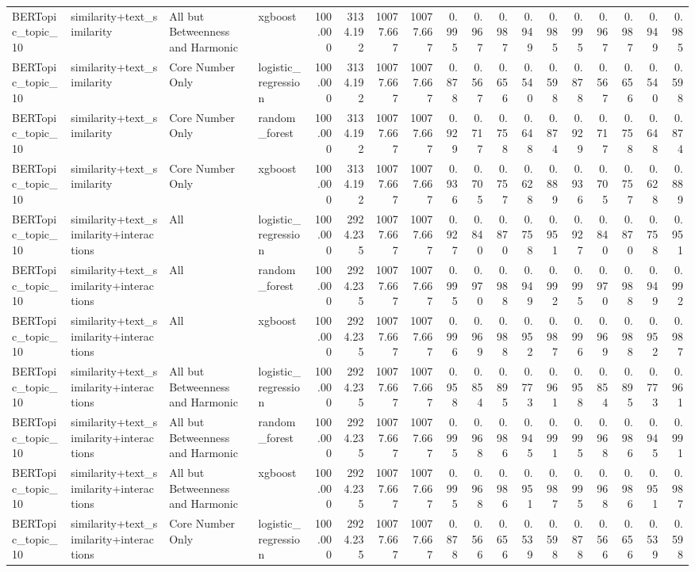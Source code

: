 \begin{tabular}{llllrrrrrrrrrrrrrr}
BERTopic_topic_10 & similarity+text_similarity & All but Betweenness and Harmonic & xgboost & 100.000 & 3134.192 & 10077.667 & 10077.667 & 0.995 & 0.967 & 0.987 & 0.949 & 0.985 & 0.995 & 0.967 & 0.987 & 0.949 & 0.985 \\
BERTopic_topic_10 & similarity+text_similarity & Core Number Only & logistic_regression & 100.000 & 3134.192 & 10077.667 & 10077.667 & 0.878 & 0.567 & 0.656 & 0.540 & 0.598 & 0.878 & 0.567 & 0.656 & 0.540 & 0.598 \\
BERTopic_topic_10 & similarity+text_similarity & Core Number Only & random_forest & 100.000 & 3134.192 & 10077.667 & 10077.667 & 0.929 & 0.717 & 0.758 & 0.648 & 0.874 & 0.929 & 0.717 & 0.758 & 0.648 & 0.874 \\
BERTopic_topic_10 & similarity+text_similarity & Core Number Only & xgboost & 100.000 & 3134.192 & 10077.667 & 10077.667 & 0.936 & 0.705 & 0.757 & 0.628 & 0.889 & 0.936 & 0.705 & 0.757 & 0.628 & 0.889 \\
BERTopic_topic_10 & similarity+text_similarity+interactions & All & logistic_regression & 100.000 & 2924.235 & 10077.667 & 10077.667 & 0.927 & 0.840 & 0.870 & 0.758 & 0.951 & 0.927 & 0.840 & 0.870 & 0.758 & 0.951 \\
BERTopic_topic_10 & similarity+text_similarity+interactions & All & random_forest & 100.000 & 2924.235 & 10077.667 & 10077.667 & 0.995 & 0.970 & 0.988 & 0.949 & 0.992 & 0.995 & 0.970 & 0.988 & 0.949 & 0.992 \\
BERTopic_topic_10 & similarity+text_similarity+interactions & All & xgboost & 100.000 & 2924.235 & 10077.667 & 10077.667 & 0.996 & 0.969 & 0.988 & 0.952 & 0.987 & 0.996 & 0.969 & 0.988 & 0.952 & 0.987 \\
BERTopic_topic_10 & similarity+text_similarity+interactions & All but Betweenness and Harmonic & logistic_regression & 100.000 & 2924.235 & 10077.667 & 10077.667 & 0.958 & 0.854 & 0.895 & 0.773 & 0.961 & 0.958 & 0.854 & 0.895 & 0.773 & 0.961 \\
BERTopic_topic_10 & similarity+text_similarity+interactions & All but Betweenness and Harmonic & random_forest & 100.000 & 2924.235 & 10077.667 & 10077.667 & 0.995 & 0.968 & 0.986 & 0.945 & 0.991 & 0.995 & 0.968 & 0.986 & 0.945 & 0.991 \\
BERTopic_topic_10 & similarity+text_similarity+interactions & All but Betweenness and Harmonic & xgboost & 100.000 & 2924.235 & 10077.667 & 10077.667 & 0.995 & 0.968 & 0.986 & 0.951 & 0.987 & 0.995 & 0.968 & 0.986 & 0.951 & 0.987 \\
BERTopic_topic_10 & similarity+text_similarity+interactions & Core Number Only & logistic_regression & 100.000 & 2924.235 & 10077.667 & 10077.667 & 0.878 & 0.566 & 0.656 & 0.539 & 0.598 & 0.878 & 0.566 & 0.656 & 0.539 & 0.598 \\

\end{tabular}
